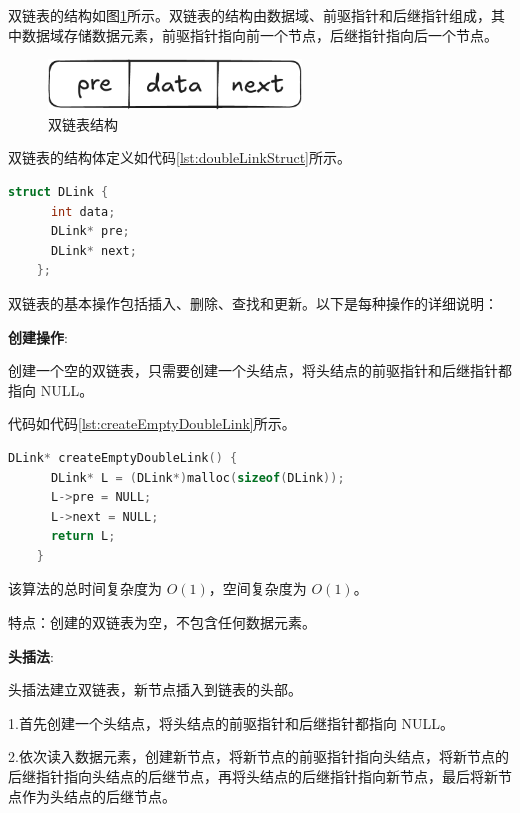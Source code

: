 \documentclass[lang=cn,newtx,10pt,scheme=chinese]{elegantbook}
\begin{document}
  双链表的结构如图\ref{fig:doubleLinkStruct}所示。双链表的结构由数据域、前驱指针和后继指针组成，其中数据域存储数据元素，前驱指针指向前一个节点，后继指针指向后一个节点。
  \begin{figure}[h]
    \centering
    \includegraphics[width=0.6\textwidth]{./figure/pdf/cropped/doubleLinkStruct.pdf}
    \caption{双链表结构}
    \label{fig:doubleLinkStruct}
  \end{figure}

  双链表的结构体定义如代码\ref{lst:doubleLinkStruct}所示。
  \begin{lstlisting}[language=C++, caption={双链表结构体定义}, label={lst:doubleLinkStruct}]
    struct DLink {
      int data;
      DLink* pre;
      DLink* next;
    };
  \end{lstlisting}

  双链表的基本操作包括插入、删除、查找和更新。以下是每种操作的详细说明：

  \textbf{创建操作}:

  创建一个空的双链表，只需要创建一个头结点，将头结点的前驱指针和后继指针都指向 NULL。

  代码如代码\ref{lst:createEmptyDoubleLink}所示。
  \begin{lstlisting}[language=C++, caption={创建一个空双链表示例代码}, label={lst:createEmptyDoubleLink}]
    DLink* createEmptyDoubleLink() {
      DLink* L = (DLink*)malloc(sizeof(DLink));
      L->pre = NULL;
      L->next = NULL;
      return L;
    }
  \end{lstlisting}
  该算法的总时间复杂度为 $O(1)$，空间复杂度为 $O(1)$。

  特点：创建的双链表为空，不包含任何数据元素。

  \textbf{头插法}:

  头插法建立双链表，新节点插入到链表的头部。

  1.首先创建一个头结点，将头结点的前驱指针和后继指针都指向 NULL。

  2.依次读入数据元素，创建新节点，将新节点的前驱指针指向头结点，将新节点的后继指针指向头结点的后继节点，再将头结点的后继指针指向新节点，最后将新节点作为头结点的后继节点。
\end{document}
